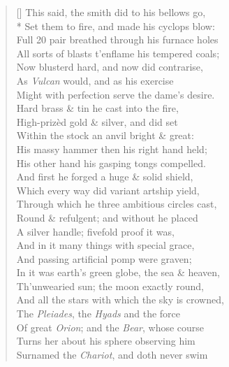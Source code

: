 \documentclass[MAIN]{subfiles}
\begin{document}
\settowidth{\versewidth}{All sorts of blasts t'enflame his tempered coals;}
\begin{verse}[\versewidth]
This said, the smith did to his bellows go,\\*
Set them to fire, and made his cyclops blow:\\
Full 20 pair breathed through his furnace holes\\
All sorts of blasts t'enflame his tempered coals;\\
Now blusterd hard, and now did contrarise,\\
As \emph{Vulcan} would, and as his exercise\\
Might with perfection serve the dame's desire.\\
Hard brass \& tin he cast into the fire,\\
High-priz\`ed gold \& silver, and did set\\
Within the stock an anvil bright \& great:\\
His massy hammer then his right hand held;\\
His other hand his gasping tongs compelled.\\
And first he forged a huge \& solid shield,\\
Which every way did variant artship yield,\\
Through which he three ambitious circles cast,\\
Round \& refulgent; and without he placed\\
A silver handle; fivefold proof it was,\\
And in it many things with special grace,\\
And passing artificial pomp were graven;\\
In it was earth's green globe, the sea \& heaven,\\
Th'unwearied sun; the moon exactly round,\\
And all the stars with which the sky is crowned,\\
The \emph{Pleiades}, the \emph{Hyads} and the force\\
Of great \emph{Orion}; and the \emph{Bear}, whose course\\
Turns her about his sphere observing him\\
Surnamed the \emph{Chariot}, and doth never swim\\

\end{verse}
\end{document}
